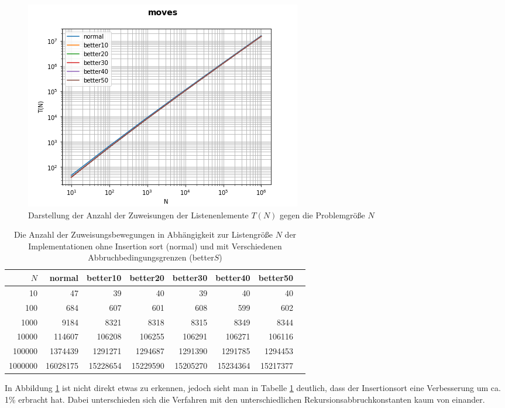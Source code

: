 \documentclass[
   draft=false
  ,paper=a4
  ,twoside=false
  ,fontsize=11pt
  ,headsepline
  ,DIV=11
  ,parskip=full+
  ,titlepage
]{scrartcl} %
\begin{document}
\begin{figure}[htp]
  \centering
  \includegraphics[width=\textwidth]{../moves.png}
  \caption[Bewegungen]{Darstellung der Anzahl der Zuweisungen der Listenenlemente $T(N)$ gegen die Problemgröße $N$}
  \label{fig:moves}
\end{figure}


\begin{table}[htp]
  \centering
  \caption[Bewegungen]{Die Anzahl der Zuweisungsbewegungen in Abhängigkeit 
  zur Listengröße $N$ der Implementationen ohne Insertion sort (normal) und
  mit Verschiedenen Abbruchbedingungsgrenzen (better$S$)}
  \label{tab:moves}
  \begin{tabular}{|r|r|r|r|r|r|r|r|}
  \hline
  $N$ & normal & better10 & better20 & better30 & better40 & better50 \\
  \hline
  10 & 47 & 39 & 40 & 39 & 40 & 40 \\
  100 & 684 & 607 & 601 & 608 & 599 & 602 \\
  1000 & 9184 & 8321 & 8318 & 8315 & 8349 & 8344 \\
  10000 & 114607 & 106208 & 106255 & 106291 & 106271 & 106116 \\
  100000 & 1374439 & 1291271 & 1294687 & 1291390 & 1291785 & 1294453 \\
  1000000 & 16028175 & 15228654 & 15229590 & 15205270 & 15234364 & 15217377 \\
  \hline
  \end{tabular}
\end{table}

In Abbildung \ref{fig:moves} ist nicht direkt etwas zu erkennen, jedoch sieht
man in Tabelle \ref{tab:moves} deutlich, dass der Insertionsort eine Verbesserung um ca. 1\% erbracht hat. Dabei unterschieden sich die Verfahren mit den unterschiedlichen Rekursionsabbruchkonstanten kaum von einander. 
\end{document}
